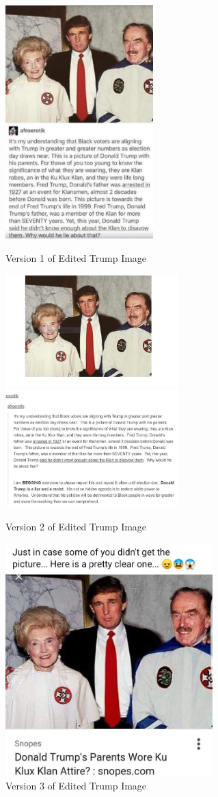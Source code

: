 \documentclass[NETN,manuscript]{stjour-new}
\begin{document}
 \begin{figure}[h]
  \includegraphics[width=\linewidth,height = 9cm]{trumpkkk1.jpg}
  \caption{Version 1 of Edited Trump Image}\label{fig:TrumpKKK1}
\endminipage\hfill
{}
  \includegraphics[width=\linewidth,height = 9cm]{trumpkkk2.jpg}
  \caption{Version 2 of Edited Trump Image}\label{fig:TrumpKKK2}
\endminipage\hfill
{}%
  \includegraphics[width=\linewidth,height = 9cm]{trumpkkk3.jpg}
  \caption{Version 3 of Edited Trump Image}\label{fig:TrumpKKK3}
\endminipage
\end{figure}
\end{document}
